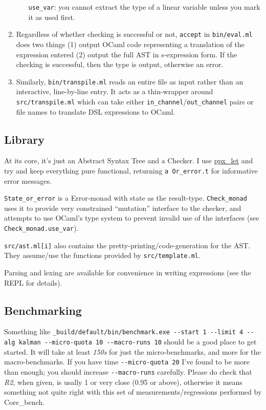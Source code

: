 \documentclass[a4paper,UKenglish]{lipics-v2019}
\begin{document}
\begin{enumerate}
\begin{itemize}
    \texttt{use\_var}: you cannot extract the type of a linear variable
    unless you mark it as used first.
  \end{itemize}
\item
  Regardless of whether checking is successful or not, \texttt{accept}
  in \texttt{bin/eval.ml} does two things (1) output OCaml code
  representing a translation of the expression entered (2) output the
  full AST in s-expression form. If the checking is successful, then the
  type is output, otherwise an error.
\item
  Similarly, \texttt{bin/transpile.ml} reads an entire file as input
  rather than an interactive, line-by-line entry. It acts as a
  thin-wrapper around \texttt{src/transpile.ml} which can take either
  \texttt{in\_channel}/\texttt{out\_channel} pairs or file names to
  translate DSL expressions to OCaml.
\end{enumerate}

\hypertarget{library}{%
\subsection{Library}\label{library}}

At its core, it's just an Abstract Syntax Tree and a Checker. I use
\href{https://github.com/janestreet/ppx_let}{ppx\_let} and try and keep
everything pure functional, returning
\texttt{\textquotesingle{}a\ Or\_error.t} for informative error
messages.

\texttt{State\_or\_error} is a Error-monad with state as the
result-type. \texttt{Check\_monad} uses it to provide very constrained
``mutation'' interface to the checker, and attempts to use OCaml's type
system to prevent invalid use of the interfaces (see
\texttt{Check\_monad.use\_var}).

\texttt{src/ast.ml{[}i{]}} also contains the
pretty-printing/code-generation for the AST. They assume/use the
functions provided by \texttt{src/template.ml}.

Parsing and lexing are available for convenience in writing expressions
(see the REPL for details).

\hypertarget{benchmarking}{%
\subsection{Benchmarking}\label{benchmarking}}

Something like
\texttt{\_build/default/bin/benchmark.exe\ -\/-start\ 1\ -\/-limit\ 4\ -\/-alg\ kalman\ -\/-micro-quota\ 10\ -\/-macro-runs\ 10}
should be a good place to get started. It will take at least \emph{150s}
for just the micro-benchmarks, and more for the macro-benchmarks. If you
have time \texttt{-\/-micro-quota\ 20} I've found to be more than
enough; you should increase \texttt{-\/-macro-runs} carefully. Please do
check that \emph{R2}, when given, is usally 1 or very close (0.95 or
above), otherwise it means something not quite right with this set of
measurements/regressions performed by Core\_bench.
\end{document}
